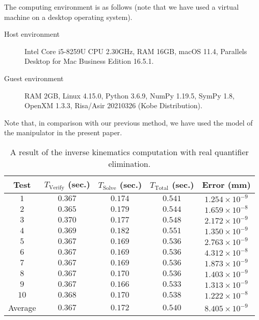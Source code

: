 \documentclass{birkjour}
\theoremstyle{plain}
\theoremstyle{definition}
\begin{document}
    The computing environment is as follows 
    (note that we have used a virtual machine on a desktop operating system).
    \begin{description}
        \item[Host environment] Intel Core i5-8259U CPU 2.30GHz, RAM 16GB, 
            macOS 11.4, Parallels Desktop for Mac Business Edition 16.5.1.
        \item[Guest environment] RAM 2GB, Linux 4.15.0, Python 3.6.9, 
            NumPy 1.19.5, SymPy 1.8, OpenXM 1.3.3, Risa/Asir 20210326 (Kobe Distribution). 
    \end{description}

    Note that, in comparison with our previous method, we have used the model of 
    the manipulator in the present paper.

    \begin{table}[t]
        \caption{A result of the inverse kinematics computation with real quantifier elimination.}
        \label{table:cgs-qe}
        \begin{center}
            \begin{tabular}{ccccc} \hline
                Test & $T_\textrm{Verify} $ (sec.) & $T_\textrm{Solve}$ (sec.) & $T_\textrm{Total}$ (sec.) & Error (mm) \\ \hline 
                $1$ & $0.367$ & $0.174$ & $0.541$ & $1.254{\times}10^{-9}$ \\ 
                $2$ & $0.365$ & $0.179$ & $0.544$ & $1.659{\times}10^{-8}$ \\ 
                $3$ & $0.370$ & $0.177$ & $0.548$ & $2.172{\times}10^{-9}$ \\ 
                $4$ & $0.369$ & $0.182$ & $0.551$ & $1.350{\times}10^{-9}$ \\ 
                $5$ & $0.367$ & $0.169$ & $0.536$ & $2.763{\times}10^{-9}$ \\ 
                $6$ & $0.367$ & $0.169$ & $0.536$ & $4.312{\times}10^{-8}$ \\ 
                $7$ & $0.367$ & $0.169$ & $0.536$ & $1.873{\times}10^{-9}$ \\ 
                $8$ & $0.367$ & $0.170$ & $0.536$ & $1.403{\times}10^{-9}$ \\ 
                $9$ & $0.367$ & $0.166$ & $0.533$ & $1.313{\times}10^{-9}$ \\ 
                $10$ & $0.368$ & $0.170$ & $0.538$ & $1.222{\times}10^{-8}$ \\ \hline 
                Average & $0.367$ & $0.172$ & $0.540$ & $8.405{\times}10^{-9}$ \\ \hline
            \end{tabular}
        \end{center}
    \end{table}
\end{document}
